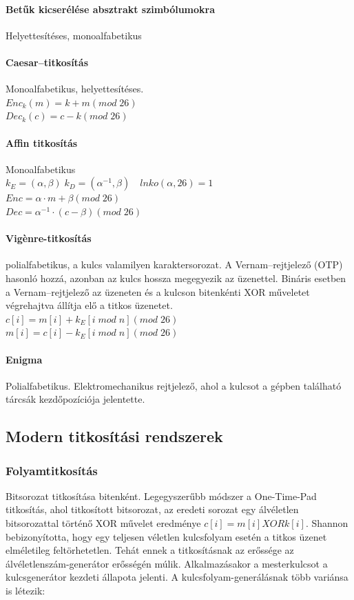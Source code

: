 \paragraph{Betűk kicserélése absztrakt szimbólumokra} Helyettesítéses, monoalfabetikus
\paragraph{Caesar--titkosítás} Monoalfabetikus, helyettesítéses.\\
$Enc_k(m) = k+m (mod\; 26)$\\
$Dec_k(c) = c-k (mod\; 26)$
\paragraph{Affin titkosítás} Monoalfabetikus\\
$k_E = (\alpha,\beta)\; k_D = (\alpha^{-1},\beta)\quad lnko(\alpha,26) = 1$\\
$Enc = \alpha \cdot m + \beta (mod\; 26)$\\
$Dec = \alpha^{-1} \cdot (c - \beta) (mod\; 26)$
\paragraph{Vigènre-titkosítás} polialfabetikus, a kulcs valamilyen karaktersorozat. A Vernam--rejtjelező (OTP) hasonló hozzá, azonban az kulcs hossza megegyezik az üzenettel. Bináris esetben a Vernam--rejtjelező az üzeneten és a kulcson bitenkénti XOR műveletet végrehajtva állítja elő a titkos üzenetet.\\
$c[i] = m[i] + k_E[i\; mod\; n] (mod\; 26)$\\
$m[i]= c[i]- k_E[i\; mod\; n] (mod\; 26)$

\paragraph{Enigma} Polialfabetikus. Elektromechanikus rejtjelező, ahol a kulcsot a gépben található tárcsák kezdőpozíciója jelentette.

\subsection{Modern titkosítási rendszerek}
\subsubsection{Folyamtitkosítás}
Bitsorozat titkosítása bitenként. Legegyszerűbb módszer a One-Time-Pad titkosítás, ahol titkosított bitsorozat, az eredeti sorozat egy álvéletlen bitsorozattal történő XOR művelet eredménye $c[i] = m[i]XORk[i]$. Shannon bebizonyította, hogy egy teljesen véletlen kulcsfolyam esetén a titkos üzenet elméletileg feltörhetetlen. Tehát ennek a titkosításnak az erőssége az álvéletlenszám-generátor erősségén múlik. Alkalmazásakor a mesterkulcsot a kulcsgenerátor kezdeti állapota jelenti. A kulcsfolyam-generálásnak több variánsa is létezik:
